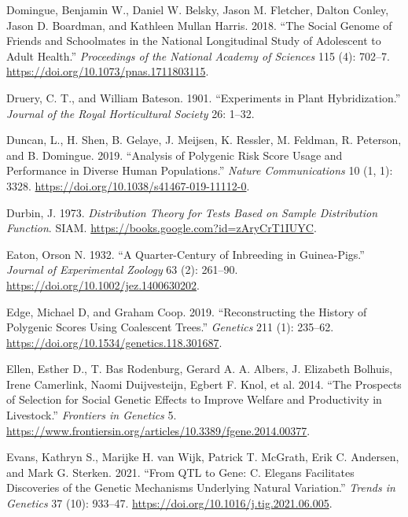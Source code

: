 \documentclass[
]{book}
\newlength{\cslhangindent}
\newlength{\cslentryspacingunit} %
\newenvironment{CSLReferences}[2] %
 {%
  \setlength{\parindent}{0pt}
  \ifodd #1
  \let\oldpar\par
  \def\par{\hangindent=\cslhangindent\oldpar}
  \fi
  \setlength{\parskip}{#2\cslentryspacingunit}
 }%
 {}
\begin{document}
\begin{CSLReferences}{1}{0}
\leavevmode{}%
Domingue, Benjamin W., Daniel W. Belsky, Jason M. Fletcher, Dalton Conley, Jason D. Boardman, and Kathleen Mullan Harris. 2018. {``The Social Genome of Friends and Schoolmates in the {National Longitudinal Study} of {Adolescent} to {Adult Health}.''} \emph{Proceedings of the National Academy of Sciences} 115 (4): 702--7. \url{https://doi.org/10.1073/pnas.1711803115}.

\leavevmode{}%
Druery, C. T., and William Bateson. 1901. {``Experiments in Plant Hybridization.''} \emph{Journal of the Royal Horticultural Society} 26: 1--32.

\leavevmode{}%
Duncan, L., H. Shen, B. Gelaye, J. Meijsen, K. Ressler, M. Feldman, R. Peterson, and B. Domingue. 2019. {``Analysis of Polygenic Risk Score Usage and Performance in Diverse Human Populations.''} \emph{Nature Communications} 10 (1, 1): 3328. \url{https://doi.org/10.1038/s41467-019-11112-0}.

\leavevmode{}%
Durbin, J. 1973. \emph{Distribution {Theory} for {Tests Based} on {Sample Distribution Function}}. {SIAM}. \url{https://books.google.com?id=zAryCrT1IUYC}.

\leavevmode{}%
Eaton, Orson N. 1932. {``A Quarter-Century of Inbreeding in Guinea-Pigs.''} \emph{Journal of Experimental Zoology} 63 (2): 261--90. \url{https://doi.org/10.1002/jez.1400630202}.

\leavevmode{}%
Edge, Michael D, and Graham Coop. 2019. {``Reconstructing the {History} of {Polygenic Scores Using Coalescent Trees}.''} \emph{Genetics} 211 (1): 235--62. \url{https://doi.org/10.1534/genetics.118.301687}.

\leavevmode{}%
Ellen, Esther D., T. Bas Rodenburg, Gerard A. A. Albers, J. Elizabeth Bolhuis, Irene Camerlink, Naomi Duijvesteijn, Egbert F. Knol, et al. 2014. {``The Prospects of Selection for Social Genetic Effects to Improve Welfare and Productivity in Livestock.''} \emph{Frontiers in Genetics} 5. \url{https://www.frontiersin.org/articles/10.3389/fgene.2014.00377}.

\leavevmode{}%
Evans, Kathryn S., Marijke H. van Wijk, Patrick T. McGrath, Erik C. Andersen, and Mark G. Sterken. 2021. {``From {QTL} to Gene: {C}. Elegans Facilitates Discoveries of the Genetic Mechanisms Underlying Natural Variation.''} \emph{Trends in Genetics} 37 (10): 933--47. \url{https://doi.org/10.1016/j.tig.2021.06.005}.


\end{CSLReferences}
\end{document}
